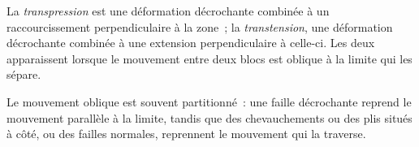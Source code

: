 \begin{definition}\label{def:b3:extension-strike-slip:transpression}
La \emph{transpression} est une déformation décrochante combinée
à un raccourcissement perpendiculaire à la zone~; la \emph{transtension},
une déformation décrochante combinée à une extension perpendiculaire à celle-ci. Les deux apparaissent lorsque
le mouvement entre deux blocs est oblique à la limite qui les sépare.
\end{definition}

Le mouvement oblique est souvent partitionné~: une faille décrochante reprend le mouvement
parallèle à la limite, tandis que des chevauchements ou des plis situés à côté, ou des failles normales,
reprennent le mouvement qui la traverse.

